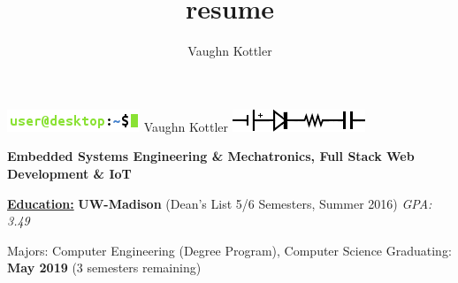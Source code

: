 \documentclass[letterpaper,10pt]{article}
\title{resume}
\author{Vaughn Kottler}
\begin{document}
\begin{center}\Huge
	\includegraphics[natwidth=150,natheight=25]{im/terminal.png}
	Vaughn Kottler
	\includegraphics[natwidth=150,natheight=25]{im/circuit.png}
\end{center}

\begin{center}\large
    \color{maroon}\textbf{
        Embedded Systems Engineering \& Mechatronics, Full Stack Web Development \& IoT
    }
\end{center}%

\noindent
\textbf{\underline{Education:}}\hspace{2.6em}%
%
\textbf{UW-Madison}
(Dean's List 5/6 Semesters, Summer 2016)
\textit{GPA: 3.49}
%
\begin{adjustwidth}{1.2in}{0in}
	{\small Majors: Computer Engineering (Degree Program), Computer Science}\break
	{\small Graduating: \textbf{May 2019} (3 semesters remaining)}\break
\end{adjustwidth}
\end{document}
